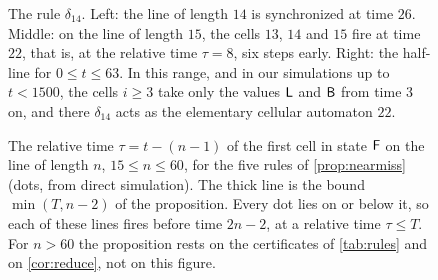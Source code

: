 \begin{figure}[t]
\centering

\caption{The rule $\delta_{14}$. Left: the line of length $14$ is synchronized
at time $26$. Middle: on the line of length $15$, the cells $13$, $14$ and $15$
fire at time $22$, that is, at the relative time $\tau=8$, six steps early.
Right: the half-line for $0\le t\le63$. In this range, and in our simulations
up to $t<1500$, the cells $i\ge3$ take only the values $\mathsf L$ and $\mathsf B$ from time
$3$ on, and there $\delta_{14}$ acts as the elementary cellular automaton $22$.}
\label{fig:delta14}
\end{figure}

\begin{table}[t]
\centering\small
\caption{The seven five-state rules of \cref{sec:five}, with their files in
\texttt{results/} of the supplementary material. Synchronized: the lengths $n$
whose line is synchronized at time $2n-2$, among $2\le n\le60$ for
$\delta_{12}$ and $\delta_{13}$ and among all $n\ge2$ for the five rules of
\cref{prop:nearmiss}. For these five rules: the bound $T$ of the proposition,
the certificate $(t_0,p)$ of \cref{lem:certificate} for $D=2T+4$, and the
number of lengths simulated in the proof, with the largest of them. $\Fq$ at
$\tau\le9$: the least length whose line has a cell in state $\Fq$ at a
relative time $\tau\le9$. Last column: the complexity $c_{78}$ of
\cref{sec:germs}.}
\label{tab:rules}
\setlength{\tabcolsep}{4.5pt}

\end{table}

\begin{figure}[t]
\centering

\caption{The relative time $\tau=t-(n-1)$ of the first cell in state $\Fq$ on
the line of length $n$, $15\le n\le60$, for the five rules of
\cref{prop:nearmiss} (dots, from direct simulation). The thick line is the
bound $\min(T,n-2)$ of the proposition. Every dot lies on or below it, so each
of these lines fires before time $2n-2$, at a relative time $\tau\le T$. For
$n>60$ the proposition rests on the certificates of \cref{tab:rules} and on
\cref{cor:reduce}, not on this figure.}
\label{fig:firstfire}
\end{figure}

